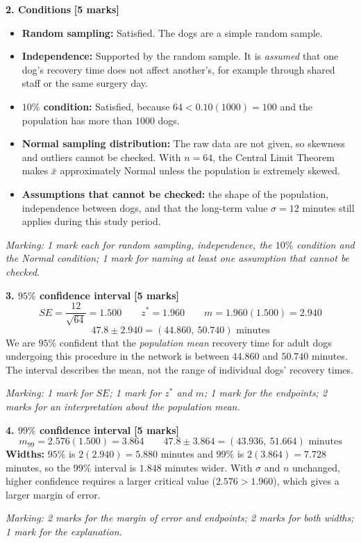 \documentclass[10pt,letterpaper]{article}
\newcommand{\partmarks}[1]{\hfill\textbf{[#1 marks]}}
\newcommand{\allocation}[1]{\par\smallskip\textit{Marking: #1}\par}
\begin{document}
\textbf{2. Conditions} \partmarks{5}
\begin{itemize}
\item \textbf{Random sampling:} Satisfied. The dogs are a simple random sample.
\item \textbf{Independence:} Supported by the random sample. It is \emph{assumed} that one dog's recovery time does not affect another's, for example through shared staff or the same surgery day.
\item \textbf{$10\%$ condition:} Satisfied, because $64<0.10(1000)=100$ and the population has more than $1000$ dogs.
\item \textbf{Normal sampling distribution:} The raw data are not given, so skewness and outliers cannot be checked. With $n=64$, the Central Limit Theorem makes $\bar x$ approximately Normal unless the population is extremely skewed.
\item \textbf{Assumptions that cannot be checked:} the shape of the population, independence between dogs, and that the long-term value $\sigma=12$ minutes still applies during this study period.
\end{itemize}

\allocation{1 mark each for random sampling, independence, the $10\%$ condition and the Normal condition; 1 mark for naming at least one assumption that cannot be checked.}

\textbf{3. $95\%$ confidence interval} \partmarks{5}
$$SE=\frac{12}{\sqrt{64}}=1.500 \qquad z^*=1.960 \qquad m=1.960(1.500)=2.940$$
$$47.8\pm2.940=\boxed{(44.860,\ 50.740)\text{ minutes}}$$
We are $95\%$ confident that the \emph{population mean} recovery time for adult dogs undergoing this procedure in the network is between $44.860$ and $50.740$ minutes. The interval describes the mean, not the range of individual dogs' recovery times.

\allocation{1 mark for $SE$; 1 mark for $z^*$ and $m$; 1 mark for the endpoints; 2 marks for an interpretation about the population mean.}

\textbf{4. $99\%$ confidence interval} \partmarks{5}
$$m_{99}=2.576(1.500)=3.864 \qquad 47.8\pm3.864=\boxed{(43.936,\ 51.664)\text{ minutes}}$$
\textbf{Widths:} $95\%$ is $2(2.940)=5.880$ minutes and $99\%$ is $2(3.864)=7.728$ minutes, so the $99\%$ interval is $1.848$ minutes wider. With $\sigma$ and $n$ unchanged, higher confidence requires a larger critical value ($2.576>1.960$), which gives a larger margin of error.

\allocation{2 marks for the margin of error and endpoints; 2 marks for both widths; 1 mark for the explanation.}
\end{document}

